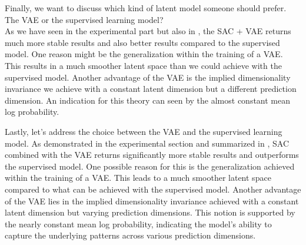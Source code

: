 

Finally, we want to discuss which kind of latent model someone should prefer. The VAE or the supervised learning model? \\
As we have seen in the experimental part but also in , the SAC + VAE returns much more stable results and also better results compared to the supervised model. One reason might be the generalization within the training of a VAE. This results in a much smoother latent space than we could achieve with the supervised model. Another advantage of the VAE is the implied dimensionality invariance we achieve with a constant latent dimension but a different prediction dimension. An indication for this theory can seen by the almost constant mean log probability. 


Lastly, let's address the choice between the VAE and the supervised learning model. As demonstrated in the experimental section and summarized in , SAC combined with the VAE returns significantly more stable results and outperforms the supervised model. One possible reason for this is the generalization achieved within the training of a VAE. This leads to a much smoother latent space compared to what can be achieved with the supervised model. Another advantage of the VAE lies in the implied dimensionality invariance achieved with a constant latent dimension but varying prediction dimensions. This notion is supported by the nearly constant mean log probability, indicating the model's ability to capture the underlying patterns across various prediction dimensions.


